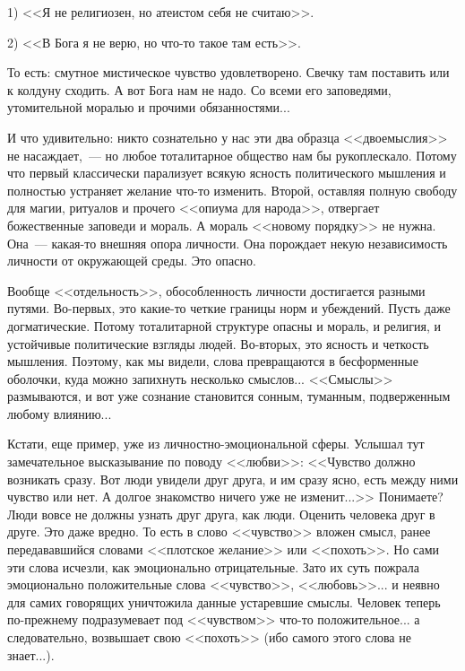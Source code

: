 \documentclass{scrbook}
\newcommand{\flqq}{<<}
\newcommand{\frqq}{>>}
\newcommand{\mdash}{~--- }
\newcommand{\commamdash}{~--- } %
\begin{document}
1) {\flqq}Я не религиозен, но атеистом себя не считаю{\frqq}. 

2) {\flqq}В Бога я не верю, но что-то такое там есть{\frqq}.
 
То есть: смутное мистическое чувство удовлетворено. Свечку там поставить или к колдуну сходить. А вот Бога нам не надо. Со всеми его заповедями, утомительной моралью и прочими обязанностями...

И что удивительно: никто сознательно у нас эти два образца {\flqq}двоемыслия{\frqq} не насаждает,{\commamdash}но любое тоталитарное общество нам бы рукоплескало. Потому что первый классически парализует всякую ясность политического мышления и полностью устраняет желание что-то изменить. Второй, оставляя полную свободу для магии, ритуалов и прочего {\flqq}опиума для народа{\frqq}, отвергает божественные заповеди и мораль. А мораль {\flqq}новому порядку{\frqq} не нужна. Она{\mdash}какая-то внешняя опора личности. Она порождает некую независимость личности от окружающей среды. Это опасно. 

Вообще {\flqq}отдельность{\frqq}, обособленность личности достигается разными путями. Во-первых, это какие-то четкие границы норм и убеждений. Пусть даже догматические. Потому тоталитарной структуре опасны и мораль, и религия, и устойчивые политические взгляды людей. Во-вторых, это ясность и четкость мышления. Поэтому, как мы видели, слова превращаются в бесформенные оболочки, куда можно запихнуть несколько смыслов... {\flqq}Смыслы{\frqq} размываются, и вот уже сознание становится сонным, туманным, подверженным любому влиянию...

Кстати, еще пример, уже из личностно-эмоциональной сферы. Услышал тут замечательное высказывание по поводу {\flqq}любви{\frqq}: {\flqq}Чувство должно возникать сразу. Вот люди увидели друг друга, и им сразу ясно, есть между ними чувство или нет. А долгое знакомство ничего уже не изменит...{\frqq} Понимаете? Люди вовсе не должны узнать друг друга, как люди. Оценить человека друг в друге. Это даже вредно. То есть в слово {\flqq}чувство{\frqq} вложен смысл, ранее передававшийся словами {\flqq}плотское желание{\frqq} или {\flqq}похоть{\frqq}. Но сами эти слова исчезли, как эмоционально отрицательные. Зато их суть пожрала эмоционально положительные слова {\flqq}чувство{\frqq}, {\flqq}любовь{\frqq}... и неявно для самих говорящих уничтожила данные устаревшие смыслы. Человек теперь по-прежнему подразумевает под {\flqq}чувством{\frqq} что-то положительное... а следовательно, возвышает свою {\flqq}похоть{\frqq} (ибо самого этого слова не знает...). 
\end{document}
